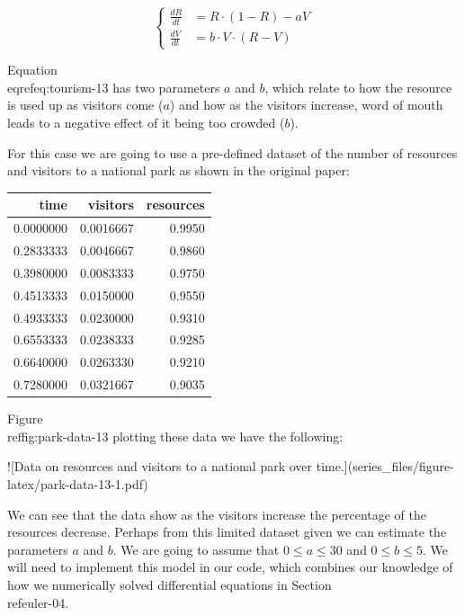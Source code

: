 \documentclass[
]{book}
\theoremstyle{definition}
\theoremstyle{definition}
\theoremstyle{definition}
\theoremstyle{remark}
\begin{document}
\begin{equation}
\begin{cases}
\frac{dR}{dt}&=R\cdot (1-R)-aV \\ \label{eq:tourism-13}
\frac{dV}{dt}&=b\cdot V \cdot (R-V)
\end{cases}
\end{equation}

Equation \\eqref{eq:tourism-13} has two parameters $a$ and $b$, which relate to how the resource is used up as visitors come ($a$) and how as the visitors increase, word of mouth leads to a negative effect of it being too crowded ($b$).

For this case we are going to use a pre-defined dataset of the number of resources and visitors to a national park as shown in the original paper:

\begin{tabular}{r|r|r}
\hline
time & visitors & resources\\
\hline
0.0000000 & 0.0016667 & 0.9950\\
\hline
0.2833333 & 0.0046667 & 0.9860\\
\hline
0.3980000 & 0.0083333 & 0.9750\\
\hline
0.4513333 & 0.0150000 & 0.9550\\
\hline
0.4933333 & 0.0230000 & 0.9310\\
\hline
0.6553333 & 0.0238333 & 0.9285\\
\hline
0.6640000 & 0.0263330 & 0.9210\\
\hline
0.7280000 & 0.0321667 & 0.9035\\
\hline
\end{tabular}

Figure \\ref{fig:park-data-13} plotting these data we have the following:

![\label{fig:park-data-13}Data on resources and visitors to a national park over time.](series_files/figure-latex/park-data-13-1.pdf) 

We can see that the data show as the visitors increase the percentage of the resources decrease.  Perhaps from this limited dataset given we can estimate the parameters $a$ and $b$.  We are going to assume that $0 \leq a \leq 30$ and $0 \leq b \leq 5$. We will need to implement this model in our code, which combines our knowledge of how we numerically solved differential equations in Section \\ref{euler-04}.
\end{document}
